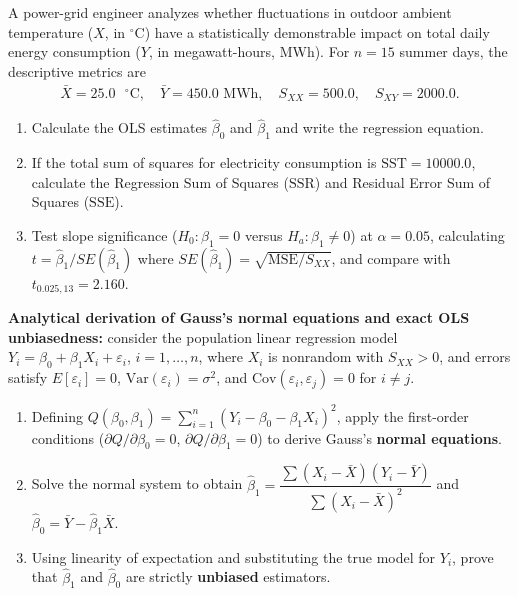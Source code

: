 \begin{problema}
\label{prob:5a642fc}
A power-grid engineer analyzes whether fluctuations in outdoor ambient temperature ($X$, in $^\circ$C) have a statistically demonstrable impact on total daily energy consumption ($Y$, in megawatt-hours, MWh). For $n=15$ summer days, the descriptive metrics are
\begin{align}
\bar X=25.0\text{ }^\circ\text{C},\quad \bar Y=450.0\text{ MWh},\quad S_{XX}=500.0,\quad S_{XY}=2000.0.
\end{align}
\begin{enumerate}
\item Calculate the OLS estimates $\hat\beta_0$ and $\hat\beta_1$ and write the regression equation.
\item If the total sum of squares for electricity consumption is $\text{SST}=10000.0$, calculate the Regression Sum of Squares ($\text{SSR}$) and Residual Error Sum of Squares ($\text{SSE}$).
\item Test slope significance ($H_0:\beta_1=0$ versus $H_a:\beta_1\ne0$) at $\alpha=0.05$, calculating $t=\hat\beta_1/SE(\hat\beta_1)$ where $SE(\hat\beta_1)=\sqrt{\text{MSE}/S_{XX}}$, and compare with $t_{0.025,13}=2.160$.
\end{enumerate}
\end{problema}

\begin{problema}
\label{prob:e97453b}
\textbf{Analytical derivation of Gauss's normal equations and exact OLS unbiasedness:} consider the population linear regression model $Y_i=\beta_0+\beta_1X_i+\varepsilon_i$, $i=1,\ldots,n$, where $X_i$ is nonrandom with $S_{XX}>0$, and errors satisfy $E[\varepsilon_i]=0$, $\text{Var}(\varepsilon_i)=\sigma^2$, and $\text{Cov}(\varepsilon_i,\varepsilon_j)=0$ for $i\ne j$.
\begin{enumerate}
\item Defining $Q(\beta_0,\beta_1)=\sum_{i=1}^n(Y_i-\beta_0-\beta_1X_i)^2$, apply the first-order conditions ($\partial Q/\partial\beta_0=0$, $\partial Q/\partial\beta_1=0$) to derive Gauss's \textbf{normal equations}.
\item Solve the normal system to obtain $\hat\beta_1=\dfrac{\sum(X_i-\bar X)(Y_i-\bar Y)}{\sum(X_i-\bar X)^2}$ and $\hat\beta_0=\bar Y-\hat\beta_1\bar X$.
\item Using linearity of expectation and substituting the true model for $Y_i$, prove that $\hat\beta_1$ and $\hat\beta_0$ are strictly \textbf{unbiased} estimators.
\end{enumerate}
\end{problema}

